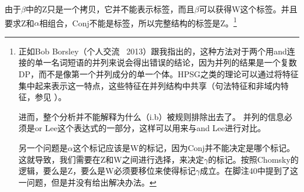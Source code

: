 由于$\beta$中的Z只是一个拷贝，它并不能表示标签，而且$\beta$可以获得W这个标签。并且要求Z和$\alpha$相组合，Conj不能是标签，所以完整结构的标签是Z。\footnote{%
正如Bob Borsley（个人交流 \, 2013）跟我指出的，这种方法对于两个用and连接的单一名词短语的并列来说会得出错误的结论，因为并列的结果是一个复数DP，而不是像第一个并列成分的单一个体。HPSG之类的理论可以通过将特征集中起来表示这一特点，这些特征在并列结构中共享（句法特征和非域内特征，参见 ）。

进而，整个分析并不能解释为什么（i.b）被规则排除出去了。
\eal
\zl
并列的信息必须是or Lee这个表达式的一部分，这样可以用来与and Lee进行对比。

另一个问题是$\alpha$这个标记应该是W的标记，因为Conj并不能决定是哪个标记。这就导致，我们需要在Z和W之间进行选择，来决定$\gamma$的标记。按照Chomsky的逻辑，要么是Z，要么是W必须要移位来使得标记$\gamma$成立。\citet{Chomsky2013a}在脚注40中提到了这一问题，但是并没有给出解决办法。
}

%

